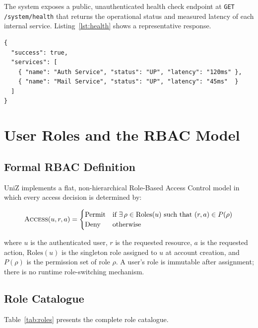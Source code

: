 \documentclass[12pt,a4paper]{report}
\newcommand{\api}[1]{\texttt{\small #1}}
\begin{document}
The system exposes a public, unauthenticated health check endpoint at \api{GET /system/health} that returns the operational status and measured latency of each internal service. Listing~\ref{lst:health} shows a representative response.

\begin{lstlisting}[caption={System health check response},label={lst:health}]
{
  "success": true,
  "services": [
    { "name": "Auth Service", "status": "UP", "latency": "120ms" },
    { "name": "Mail Service", "status": "UP", "latency": "45ms"  }
  ]
}
\end{lstlisting}

\chapter{User Roles and the RBAC Model}

\section{Formal RBAC Definition}

UniZ implements a flat, non-hierarchical Role-Based Access Control model in which every access decision is determined by:

\begin{equation}
  \textsc{Access}(u, r, a) = \begin{cases} \text{Permit} & \text{if } \exists\, \rho \in \text{Roles}(u) \text{ such that } (r, a) \in P(\rho) \\ \text{Deny} & \text{otherwise} \end{cases}
  \label{eq:rbac}
\end{equation}

where $u$ is the authenticated user, $r$ is the requested resource, $a$ is the requested action, $\text{Roles}(u)$ is the singleton role assigned to $u$ at account creation, and $P(\rho)$ is the permission set of role $\rho$. A user's role is immutable after assignment; there is no runtime role-switching mechanism.

\section{Role Catalogue}

Table~\ref{tab:roles} presents the complete role catalogue.
\end{document}
